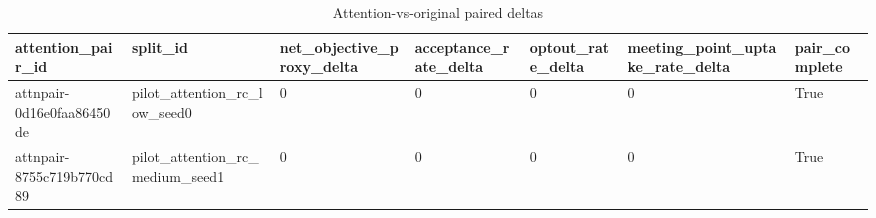 \begin{table}[ht]
\centering
\begin{tabular}{lllllll}
 \hline
attention\_pair\_id & split\_id & net\_objective\_proxy\_delta & acceptance\_rate\_delta & optout\_rate\_delta & meeting\_point\_uptake\_rate\_delta & pair\_complete \\
 \hline
attnpair-0d16e0faa86450de & pilot\_attention\_rc\_low\_seed0 & 0 & 0 & 0 & 0 & True \\
attnpair-8755c719b770cd89 & pilot\_attention\_rc\_medium\_seed1 & 0 & 0 & 0 & 0 & True \\
 \hline
\end{tabular}
\caption{Attention-vs-original paired deltas}
\end{table}

